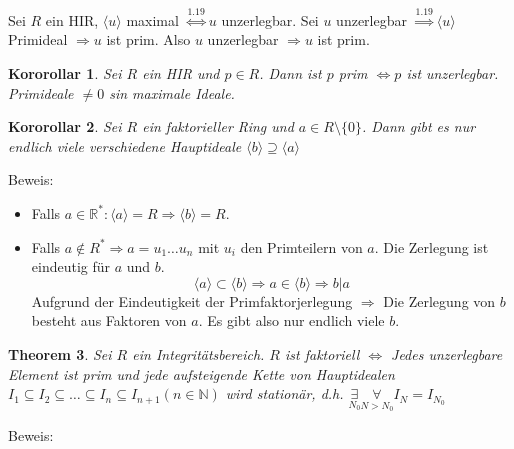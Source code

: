 \documentclass{article}
\newtheorem{thm}{Theorem}[section]
\newtheorem{korollar}[thm]{Kororollar}
\newcommand{\N}{\mathbb{N}}
\newcommand{\R}{\mathbb{R}}
\begin{document}
\color{blue}
Sei $R$ ein HIR, $\langle u\rangle$ maximal
$\overset{1.19}\Leftrightarrow u$ unzerlegbar.
Sei $u$ unzerlegbar $\overset{1.19}\Rightarrow
\langle u\rangle$ Primideal $\Rightarrow u$ ist
prim. Also $u$ unzerlegbar $\Rightarrow u$ ist prim.
\color{black}
\begin{korollar}
    Sei $R$ ein HIR und $p\in R$. Dann ist $p$ prim
    $\Leftrightarrow p$ ist unzerlegbar. Primideale $\neq 0$
    sin maximale Ideale.
\end{korollar}
\begin{korollar}
    Sei $R$ ein faktorieller Ring und $a\in R\setminus\{0\}$.
    Dann gibt es nur endlich viele verschiedene Hauptideale
    $\langle b\rangle\supseteq\langle a\rangle$
\end{korollar}
Beweis:
\begin{itemize}
    \item
        Falls $a\in\R^*:\langle a\rangle=R\Rightarrow
        \langle b\rangle=R$.
    \item
        Falls $a\notin R^*\Rightarrow a=u_1\hdots u_n$ mit
        $u_i$ den Primteilern von $a$. Die Zerlegung ist
        eindeutig für $a$ und $b$.
        \begin{equation*}
            \langle a\rangle\subset\langle b\rangle
            \Rightarrow a\in\langle b\rangle\Rightarrow b|a
        \end{equation*}
        Aufgrund der Eindeutigkeit der Primfaktorjerlegung
        $\Rightarrow$ Die Zerlegung von $b$ besteht
        aus Faktoren von $a$.
        Es gibt also nur endlich viele $b$.
\end{itemize}
\begin{thm}
    Sei $R$ ein Integritätsbereich. $R$ ist faktoriell
    $\Leftrightarrow$ Jedes unzerlegbare Element ist prim
    und jede aufsteigende Kette von Hauptidealen
    $I_1\subseteq I_2\subseteq\hdots\subseteq I_n\subseteq
    I_{n+1}(n\in\N)$ wird stationär, d.h.
    $\underset{N_0}\exists\underset{N>N_0}\forall I_N=
    I_{N_0}$
\end{thm}
Beweis:
\end{document}
